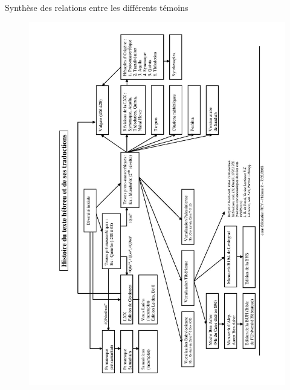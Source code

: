 \documentclass[11pt]{beamer}
\begin{document}
\begin{frame}{Synthèse des relations entre les différents témoins}
\begin{figure}
    \centering
    \includegraphics[width=1\linewidth]{img/Tableau histoire du texte de la bible hébraïque.jpg}
\end{figure}
    
\end{frame}
\end{document}
